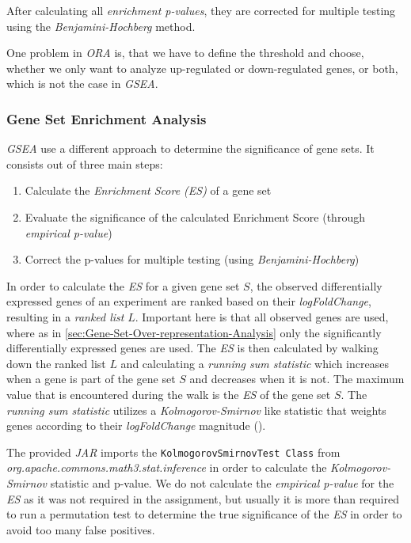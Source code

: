 \documentclass[12pt]{article}
\begin{document}
After calculating all \textit{enrichment p-values}, they are corrected for multiple testing
using the \textit{Benjamini-Hochberg} method.

One problem in \textit{ORA} is, that we have to define the threshold and choose, whether we only want to
analyze up-regulated or down-regulated genes, or both, which is not the case in \textit{GSEA}.

\subsubsection{Gene Set Enrichment Analysis}\label{sec:Gene-Set-Enrichment-Analysis}
\textit{GSEA} use a different approach to determine the significance of gene sets.
It consists out of three main steps:
\begin{enumerate}
    \item Calculate the \textit{Enrichment Score (ES)} of a gene set
    \item Evaluate the significance of the calculated Enrichment Score (through \textit{empirical p-value})
    \item Correct the p-values for multiple testing (using \textit{Benjamini-Hochberg})
\end{enumerate}

In order to calculate the \textit{ES} for a given gene set $S$,
the observed differentially expressed genes of an experiment are ranked
based on their \textit{logFoldChange}, resulting in a \textit{ranked list} $L$.
Important here is that all observed genes are used, where as in 
\ref{sec:Gene-Set-Over-representation-Analysis} only the significantly differentially 
expressed genes are used. 
The \textit{ES} is then calculated by walking down the ranked list $L$ and
calculating a \textit{running sum statistic} which increases when a gene
is part of the gene set $S$ and decreases when it is not.
The maximum value that is encountered during the walk is the \textit{ES} of the gene set $S$.
The \textit{running sum statistic} utilizes a \textit{Kolmogorov-Smirnov} like statistic 
that weights genes according to their \textit{logFoldChange} magnitude (\cite{GSEA}).


The provided \textit{JAR} imports the \texttt{KolmogorovSmirnovTest Class} from \\
\textit{org.apache.commons.math3.stat.inference} in order to calculate the
\textit{Kolmogorov-Smirnov} statistic and p-value.
We do not calculate the \textit{empirical p-value} for the \textit{ES} as it was 
not required in the assignment, but usually it is more than required to
run a permutation test to determine the true significance of the \textit{ES}
in order to avoid too many false positives.
\end{document}
